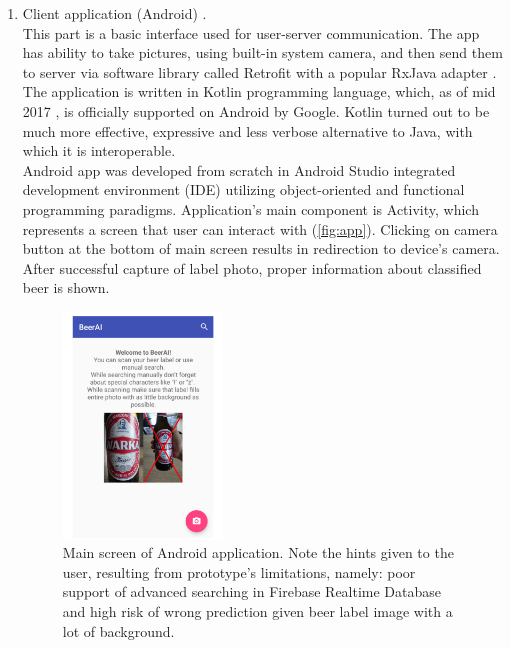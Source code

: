 \documentclass[11pt, a4paper]{article}
\begin{document}
\begin{enumerate}[1)]
\item Client application (Android) \cite{android_app_repo}. \\
This part is a basic interface used for user-server communication. The app has ability to take pictures, using built-in system camera, and then send them to server via software library called Retrofit \cite{retrofit_repo} with a popular RxJava adapter \cite{rxjava_repo}. The application is written in Kotlin programming language, which, as of mid 2017 \cite{kotlin_blogpost}, is officially supported on Android by Google. Kotlin turned out to be much more effective, expressive and less verbose alternative to Java, with which it is interoperable.\\

Android app was developed from scratch in Android Studio integrated development environment (IDE) utilizing object-oriented and functional programming paradigms. Application's main component is Activity, which represents a screen that user can interact with (\autoref{fig:app}). Clicking on camera button at the bottom of main screen results in redirection to device's camera. After successful capture of label photo, proper information about classified beer is shown. 

\begin{figure}[h]
\includegraphics[width=0.4\textwidth]{app}
\centering
\caption[Główny ekran aplikacji na Androida]{Main screen of Android application. Note the hints given to the user, resulting from prototype's limitations, namely: poor support of advanced searching in Firebase Realtime Database and high risk of wrong prediction given beer label image with a lot of background.}
\label{fig:app}
\end{figure}


\end{enumerate}
\end{document}
